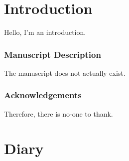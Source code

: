 
\part{Introduction} %

Hello, I'm an introduction.

\section{Manuscript Description}

The manuscript does not actually exist.

\section{Acknowledgements}

Therefore, there is no-one to thank.

\part{Diary} %
